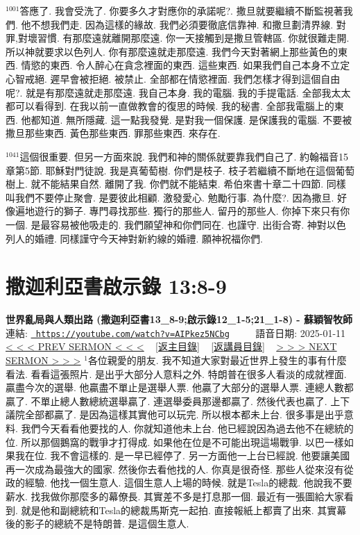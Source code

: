 \documentclass{book}
\begin{document}
$^{1001}$答應了.
我會受洗了.
你要多久才對應你的承諾呢?.
撒旦就要繼續不斷監視著我們.
他不想我們走.
因為這樣的緣故.
我們必須要徹底信靠神.
和撒旦劃清界線.
對罪,對壞習慣.
有那麼遠就離開那麼遠.
你一天接觸到是撒旦管轄區.
你就很難走開.
所以神就要求以色列人.
你有那麼遠就走那麼遠.
我們今天對著網上那些黃色的東西.
情慾的東西.
令人醉心在貪念裡面的東西.
這些東西.
如果我們自己本身不立定心智戒絕.
遲早會被拒絕.
被禁止.
全部都在情慾裡面.
我們怎樣才得到這個自由呢?.
就是有那麼遠就走那麼遠.
我自己本身.
我的電腦.
我的手提電話.
全部我太太都可以看得到.
在我以前一直做教會的復思的時候.
我的秘書.
全部我電腦上的東西.
他都知道.
無所隱藏.
這一點我發覺.
是對我一個保護.
是保護我的電腦.
不要被撒旦那些東西.
黃色那些東西.
罪那些東西.
來存在.

$^{1041}$這個很重要.
但另一方面來說.
我們和神的關係就要靠我們自己了.
約翰福音15章第5節.
耶穌對門徒說.
我是真葡萄樹.
你們是枝子.
枝子若繼續不斷地在這個葡萄樹上.
就不能結果自然.
離開了我.
你們就不能結束.
希伯來書十章二十四節.
同樣叫我們不要停止聚會.
是要彼此相顧.
激發愛心.
勉勵行事.
為什麼?.
因為撒旦.
好像遍地遊行的獅子.
專門尋找那些.
獨行的那些人.
留丹的那些人.
你掉下來只有你一個.
是最容易被他吸走的.
我們願望神和你們同在.
也謹守.
出街合寄.
神對以色列人的婚禮.
同樣謹守今天神對新約線的婚禮.
願神祝福你們.
\newpage



\section{撒迦利亞書啟示錄 13:8-9}
\label{sec:AIPkez5NCbg}
\textbf{世界亂局與人類出路 (撒迦利亞書13\_8-9;啟示錄12\_1-5;21\_1-8) -  蘇穎智牧師}
\newline
\newline
連結: \href{https://youtube.com/watch?v=AIPkez5NCbg}{\texttt{ https://youtube.com/watch?v=AIPkez5NCbg}} ~~~~ 語音日期: 2025-01-11 
\newline
\newline
\hyperref[sec:QwQqFfjJiJo]{< < < PREV SERMON < < <}
~
\hyperlink{toc}{[返主目錄]}
~
\hyperref[ch:preacher8]{[返講員目錄]}
~
\hyperref[sec:prT7wwZLltI]{> > > NEXT SERMON > > >}
\newline
\newline
$^{1}$各位親愛的朋友.
我不知道大家對最近世界上發生的事有什麼看法.
看看這張照片.
是出乎大部分人意料之外.
特朗普在很多人看淡的成就裡面.
贏盡今次的選舉.
他贏盡不單止是選舉人票.
他贏了大部分的選舉人票.
連總人數都贏了.
不單止總人數總統選舉贏了.
連選舉委員那邊都贏了.
然後代表也贏了.
上下議院全部都贏了.
是因為這樣其實他可以玩完.
所以根本都未上台.
很多事是出乎意料.
我們今天看看他要找的人.
你就知道他未上台.
他已經說因為過去他不在總統的位.
所以那個鵝窩的戰爭才打得成.
如果他在位是不可能出現這場戰爭.
以巴一樣如果我在位.
我不會這樣的.
是一早已經停了.
另一方面他一上台已經說.
他要讓美國再一次成為最強大的國家.
然後你去看他找的人.
你真是很奇怪.
那些人從來沒有從政的經驗.
他找一個生意人.
這個生意人上場的時候.
就是Tesla的總裁.
他說我不要薪水.
找我做你那麼多的幕僚長.
其實差不多是打息那一個.
最近有一張圖給大家看到.
就是他和副總統和Tesla的總裁馬斯克一起拍.
直接報紙上都賣了出來.
其實幕後的影子的總統不是特朗普.
是這個生意人.
\end{document}
